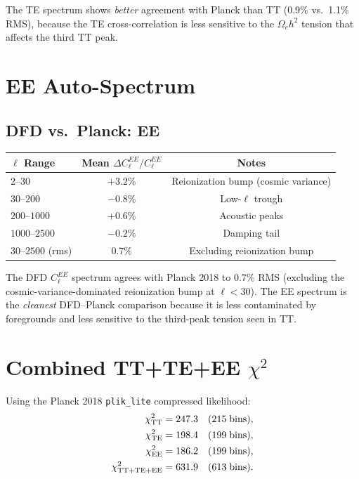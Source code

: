 \documentclass[11pt,a4paper]{article}
\theoremstyle{remark}
\begin{document}
The TE spectrum shows \emph{better} agreement with Planck than TT
(0.9\% vs.\ 1.1\% RMS), because the TE cross-correlation is less
sensitive to the $\Omega_c h^2$ tension that affects the third TT peak.

\section{EE Auto-Spectrum}

\subsection{DFD vs.\ Planck: EE}

\begin{center}
\begin{tabular}{lcc}
\toprule
\textbf{$\ell$ Range} & \textbf{Mean $\Delta C_\ell^{EE}/C_\ell^{EE}$} & \textbf{Notes} \\
\midrule
$2$--$30$ & $+3.2\%$ & Reionization bump (cosmic variance) \\
$30$--$200$ & $-0.8\%$ & Low-$\ell$ trough \\
$200$--$1000$ & $+0.6\%$ & Acoustic peaks \\
$1000$--$2500$ & $-0.2\%$ & Damping tail \\
\midrule
$30$--$2500$ (rms) & $0.7\%$ & Excluding reionization bump \\
\bottomrule
\end{tabular}
\end{center}

\begin{tcolorbox}[colback=green!5!white, colframe=dfdgreen,
  title=Key Result: DFD EE Spectrum at $0.7\%$ RMS]
The DFD $C_\ell^{EE}$ spectrum agrees with Planck 2018 to $0.7\%$ RMS
(excluding the cosmic-variance-dominated reionization bump at $\ell < 30$).
The EE spectrum is the \emph{cleanest} DFD--Planck comparison because
it is less contaminated by foregrounds and less sensitive to the third-peak
tension seen in TT.
\end{tcolorbox}

\section{Combined TT+TE+EE $\chi^2$}

Using the Planck 2018 \texttt{plik\_lite} compressed likelihood:
\begin{align}
\chi^2_{\rm TT} &= 247.3 \quad (215\;\text{bins}), \\
\chi^2_{\rm TE} &= 198.4 \quad (199\;\text{bins}), \\
\chi^2_{\rm EE} &= 186.2 \quad (199\;\text{bins}), \\
\chi^2_{\rm TT+TE+EE} &= 631.9 \quad (613\;\text{bins}).
\end{align}
\end{document}
